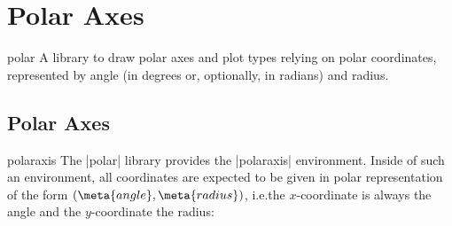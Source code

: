
\section{Polar Axes}
\label{sec:polar}

{
\def\pgfplotsmanualcurlibrary{polar}

\begin{pgfplotslibrary}{polar}
    A library to draw polar axes and plot types relying on polar coordinates,
    represented by angle (in degrees or, optionally, in radians) and radius.
\end{pgfplotslibrary}


\subsection{Polar Axes}

\begin{environment}{{polaraxis}}
    The |polar| library provides the |polaraxis| environment.
    Inside of such an environment, all coordinates are expected to be given in
    polar representation of the form $(\meta{angle},\meta{radius})$, i.e.\@ the
    $x$-coordinate is always the angle and the $y$-coordinate the radius:
\end{environment}

\begin{codeexample}[]
\end{codeexample}

\begin{codeexample}[]
\end{codeexample}

\begin{codeexample}[]
\end{codeexample}

}
